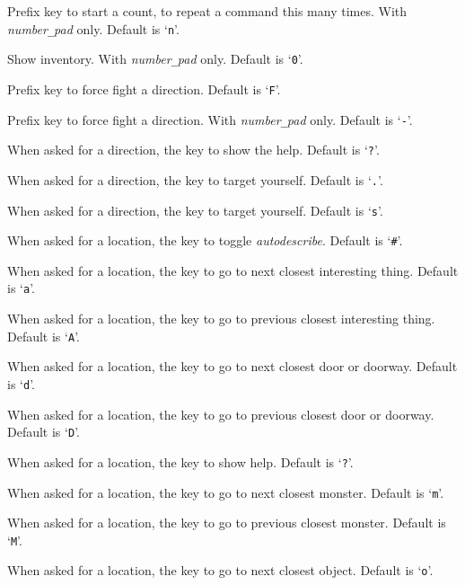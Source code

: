 \blist{}
\item{}
Prefix key to start a count, to repeat a command this many times.
With {\it number\verb+_+pad\/} only. Default is `{\tt n}'.
\item{}
Show inventory. With {\it number\verb+_+pad\/} only. Default is `{\tt 0}'.
\item{}
Prefix key to force fight a direction. Default is `{\tt F}'.
\item{}
Prefix key to force fight a direction. With {\it number\verb+_+pad\/} only.
Default is `{\tt -}'.
\item{}
When asked for a direction, the key to show the help. Default is `{\tt ?}'.
\item{}
When asked for a direction, the key to target yourself. Default is `{\tt .}'.
\item{}
When asked for a direction, the key to target yourself. Default is `{\tt s}'.
\item{}
When asked for a location, the key to toggle {\it autodescribe\/}.
Default is `{\tt \#}'.
\item{}
When asked for a location, the key to go to next closest interesting thing.
Default is `{\tt a}'.
\item{}
When asked for a location, the key to go to previous closest interesting thing.
Default is `{\tt A}'.
\item{}
When asked for a location, the key to go to next closest door or doorway.
Default is `{\tt d}'.
\item{}
When asked for a location, the key to go to previous closest door or doorway.
Default is `{\tt D}'.
\item{}
When asked for a location, the key to show help. Default is `{\tt ?}'.
\item{}
When asked for a location, the key to go to next closest monster.
Default is `{\tt m}'.
\item{}
When asked for a location, the key to go to previous closest monster.
Default is `{\tt M}'.
\item{}
When asked for a location, the key to go to next closest object.
Default is `{\tt o}'.
\item{}
